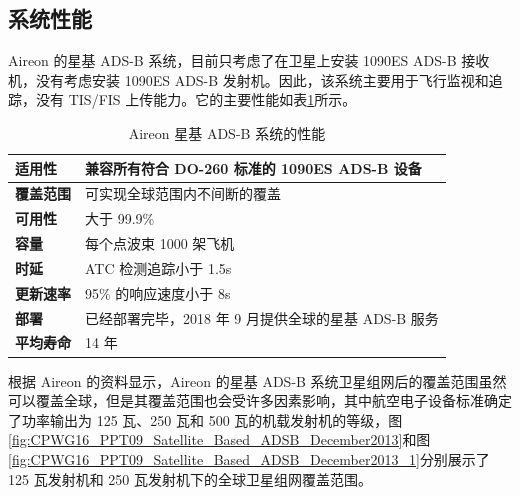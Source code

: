 
\subsection{系统性能}

Aireon 的星基 ADS-B 系统，目前只考虑了在卫星上安装 1090ES ADS-B 接收机，没有考虑安装 1090ES ADS-B 发射机。因此，该系统主要用于飞行监视和追踪，没有 \acs{TIS}/\acs{FIS} 上传能力。它的主要性能如表\ref{tab:aireon_ads-b_performance_para}所示。

\renewcommand\arraystretch{1.5}
\begin{table}[!htb]
\centering
\caption{Aireon 星基 ADS-B 系统的性能}
\label{tab:aireon_ads-b_performance_para}
\begin{tabular}[b]{|p{2.2cm}<{\raggedleft}|p{10.5cm}<{\raggedright}|}
\hline
\textbf{适用性} & 兼容所有符合 DO-260 标准的 1090ES ADS-B 设备 \\
\hline
\textbf{覆盖范围} & 可实现全球范围内不间断的覆盖 \\
\hline
\textbf{可用性} & 大于 99.9\% \\
\hline
\textbf{容量} & 每个点波束 1000 架飞机 \\
\hline
\textbf{时延} & ATC 检测追踪小于 1.5s \\
\hline
\textbf{更新速率} & 95\% 的响应速度小于 8s \\
\hline
\textbf{部署} & 已经部署完毕，2018 年 9 月提供全球的星基 ADS-B 服务 \\
\hline
\textbf{平均寿命} & 14 年 \\
\hline
\end{tabular}
\end{table}

根据 Aireon 的资料显示，Aireon 的星基 ADS-B 系统卫星组网后的覆盖范围虽然可以覆盖全球，但是其覆盖范围也会受许多因素影响，其中航空电子设备标准确定了功率输出为 125 瓦、250 瓦和 500 瓦的机载发射机的等级，图\ref{fig:CPWG16_PPT09_Satellite_Based_ADSB_December2013}和图\ref{fig:CPWG16_PPT09_Satellite_Based_ADSB_December2013_1}分别展示了 125 瓦发射机和 250 瓦发射机下的全球卫星组网覆盖范围。


